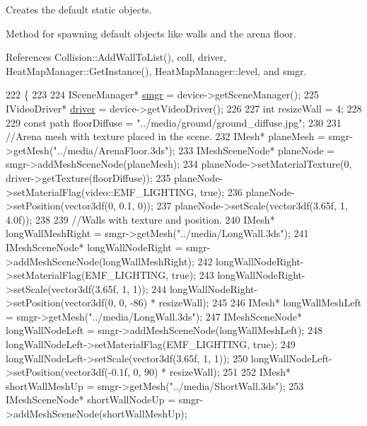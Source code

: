 Creates the default static objects. 

Method for spawning default objects like walls and the arena floor. 



 

 

References Collision\-::\-Add\-Wall\-To\-List(), coll, driver, Heat\-Map\-Manager\-::\-Get\-Instance(), Heat\-Map\-Manager\-::level, and smgr.


\begin{DoxyCode}
222                                                                            \{
223 
224     ISceneManager* \hyperlink{_game_8cpp_a80a0cf5a63a07fec786bf483e5f22c39}{smgr} = device->getSceneManager();
225     IVideoDriver* \hyperlink{_game_8cpp_ae8ebff0dce398b6764c0e99ec847754a}{driver} = device->getVideoDriver();
226 
227     \textcolor{keywordtype}{int} resizeWall = 4;
228 
229     \textcolor{keyword}{const} path floorDiffuse = \textcolor{stringliteral}{"../media/ground/ground\_diffuse.jpg"};
230 
231     \textcolor{comment}{//Arena mesh with texture placed in the scene.}
232     IMesh* planeMesh = smgr->getMesh(\textcolor{stringliteral}{"../media/ArenaFloor.3ds"});
233     IMeshSceneNode* planeNode = smgr->addMeshSceneNode(planeMesh);
234     planeNode->setMaterialTexture(0, driver->getTexture(floorDiffuse));
235     planeNode->setMaterialFlag(video::EMF\_LIGHTING, \textcolor{keyword}{true});
236     planeNode->setPosition(vector3df(0, 0.1, 0));
237     planeNode->setScale(vector3df(3.65f, 1, 4.0f));
238 
239     \textcolor{comment}{//Walls with texture and position.}
240     IMesh* longWallMeshRight = smgr->getMesh(\textcolor{stringliteral}{"../media/LongWall.3ds"});
241     IMeshSceneNode* longWallNodeRight = smgr->addMeshSceneNode(longWallMeshRight);
242     longWallNodeRight->setMaterialFlag(EMF\_LIGHTING, \textcolor{keyword}{true});
243     longWallNodeRight->setScale(vector3df(3.65f, 1, 1));
244     longWallNodeRight->setPosition(vector3df(0, 0, -86) * resizeWall);
245 
246     IMesh* longWallMeshLeft = smgr->getMesh(\textcolor{stringliteral}{"../media/LongWall.3ds"});
247     IMeshSceneNode* longWallNodeLeft = smgr->addMeshSceneNode(longWallMeshLeft);
248     longWallNodeLeft->setMaterialFlag(EMF\_LIGHTING, \textcolor{keyword}{true});
249     longWallNodeLeft->setScale(vector3df(3.65f, 1, 1));
250     longWallNodeLeft->setPosition(vector3df(-0.1f, 0, 90) * resizeWall);
251 
252     IMesh* shortWallMeshUp = smgr->getMesh(\textcolor{stringliteral}{"../media/ShortWall.3ds"});
253     IMeshSceneNode* shortWallNodeUp = smgr->addMeshSceneNode(shortWallMeshUp);

\end{DoxyCode}
